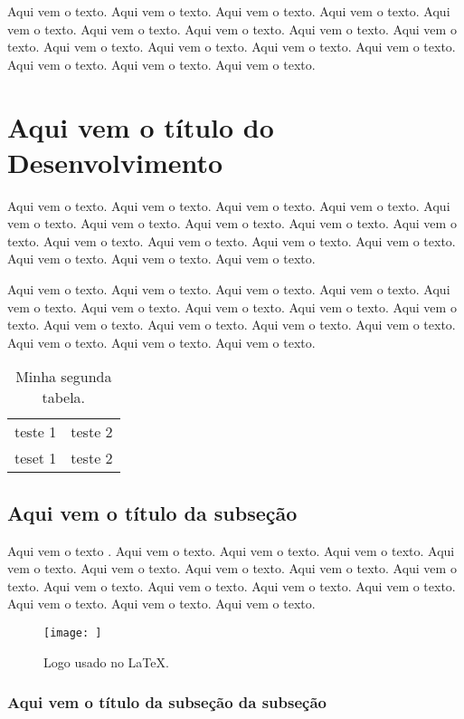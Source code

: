 \documentclass[a4paper, 12pt]{article}
\begin{document}
Aqui vem o texto. Aqui vem o texto. Aqui vem o texto. Aqui vem o texto.
Aqui vem o texto. Aqui vem o texto. Aqui vem o texto. Aqui vem o texto.
Aqui vem o texto. Aqui vem o texto. Aqui vem o texto. Aqui vem o texto.
Aqui vem o texto. Aqui vem o texto. Aqui vem o texto. Aqui vem o texto.

\section{Aqui vem o título do Desenvolvimento}

Aqui vem o texto. Aqui vem o texto. Aqui vem o texto. Aqui vem o texto.
Aqui vem o texto. Aqui vem o texto. Aqui vem o texto. Aqui vem o texto.
Aqui vem o texto. Aqui vem o texto. Aqui vem o texto. Aqui vem o texto.
Aqui vem o texto. Aqui vem o texto. Aqui vem o texto. Aqui vem o texto.

Aqui vem o texto. Aqui vem o texto. Aqui vem o texto. Aqui vem o texto.
Aqui vem o texto. Aqui vem o texto. Aqui vem o texto. Aqui vem o texto.
Aqui vem o texto. Aqui vem o texto. Aqui vem o texto. Aqui vem o texto.
Aqui vem o texto. Aqui vem o texto. Aqui vem o texto. Aqui vem o texto.

\begin{table}[htb]
 \centering
 \begin{tabular}{|c|c|}
  teste 1 & teste 2 \\
  teset 1 & teste 2 \\ 
 \end{tabular}
 \caption{Minha segunda tabela.}
 \label{minha-outra-tabela}
\end{table}

\subsection{Aqui vem o título da subseção}

Aqui vem o texto \cite{meuartigo}. Aqui vem o texto. Aqui vem o texto. Aqui vem o texto.
Aqui vem o texto. Aqui vem o texto. Aqui vem o texto. Aqui vem o texto.
Aqui vem o texto. Aqui vem o texto. Aqui vem o texto. Aqui vem o texto.
Aqui vem o texto. Aqui vem o texto. Aqui vem o texto. Aqui vem o texto.

\begin{figure}[htb]
 \centering
 \texttt{[image: ]}
 \caption{Logo usado no \LaTeX.}
 \label{figura-leao}
\end{figure}

\subsubsection{Aqui vem o título da subseção da subseção}
\end{document}
